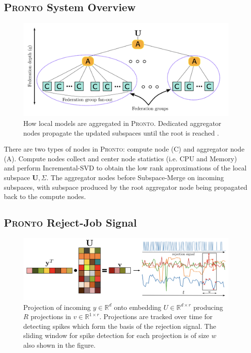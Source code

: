 \subsection{\protect\textsc{Pronto} System Overview}
\begin{figure}[H]
    \centering
    \includegraphics[width=\textwidth]{images/pronto-agg.png}
    \caption{How local models are aggregated in \textsc{Pronto}. Dedicated aggregator
    nodes propagate the updated subspaces until the root is reached
    \cite{grammenos_pronto_2021}.}
    \label{pronto-agg}
\end{figure}
There are two types of nodes in \textsc{Pronto}: compute node (C) and aggregator node
(A). Compute nodes collect and center node statistics (i.e. CPU and Memory) and
perform Incremental-SVD to obtain the low rank approximations of the local
subspace $\mathbf{U},\Sigma$. The aggregator nodes before Subspace-Merge on
incoming subspaces, with subspace produced by the root aggregator node being
propagated back to the compute nodes.

\subsection{\protect\textsc{Pronto} Reject-Job Signal}
\begin{figure}[H]
    \centering
    \includegraphics[width=\textwidth]{images/pronto}
    \caption{Projection of incoming $y \in \mathbb{R}^d$ onto embedding $U \in
    \mathbb{R}^{d \times r}$ producing $R$ projections in $v \in \mathbb{R}^{1
    \times r}$. Projections are tracked over time for detecting spikes which
    form the basis of the rejection signal. The sliding window for spike
    detection for each projection is of size $w$ also shown in the figure.}
    \label{pronto-components}
\end{figure}

